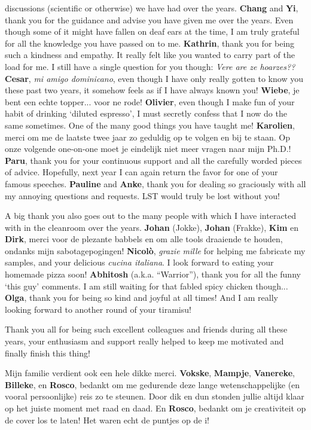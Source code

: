 discussions (scientific or otherwise) we have had over the years. \textbf{Chang} and \textbf{Yi}, thank you
for the guidance and advise you have given me over the years. Even though some of it might have fallen on deaf
ears at the time, I am truly grateful for all the knowledge you have passed on to me. \textbf{Kathrin}, thank
you for being such a kindness and empathy. It really felt like you wanted to carry part of the load for me. I
still have a single question for you though: \textit{Vere are ze hoarzes??} \textbf{Cesar}, \textit{mi amigo
dominicano}, even though I have only really gotten to know you these past two years, it somehow feels as if I
have always known you! \textbf{Wiebe}, je bent een echte topper... voor ne rode! \textbf{Olivier}, even though
I make fun of your habit of drinking `diluted espresso', I must secretly confess that I now do the same
sometimes. One of the many good things you have taught me! \textbf{Karolien}, merci om me de laatste twee jaar
zo geduldig op te volgen en bij te staan. Op onze volgende one-on-one moet je eindelijk niet meer vragen naar
mijn Ph.D.! \textbf{Paru}, thank you for your continuous support and all the carefully worded pieces of
advice. Hopefully, next year I can again return the favor for one of your famous speeches. \textbf{Pauline}
and \textbf{Anke}, thank you for dealing so graciously with all my annoying questions and requests. LST would
truly be lost without you!

A big thank you also goes out to the many people with which I have interacted with in the cleanroom over the
years. \textbf{Johan} (Jokke), \textbf{Johan} (Frakke), \textbf{Kim} en \textbf{Dirk}, merci voor de plezante
babbels en om alle tools draaiende te houden, ondanks mijn sabotagepogingen! \textbf{Nicol\`{o}},
\textit{grazie mille} for helping me fabricate my samples, and your delicious \textit{cucina italiana}. I look
forward to eating your homemade pizza soon! \textbf{Abhitosh} (a.k.a. ``Warrior''), thank you for all the
funny `this guy' comments. I am still waiting for that fabled spicy chicken though... \textbf{Olga}, thank you
for being so kind and joyful at all times! And I am really looking forward to another round of your tiramisu!

Thank you all for being such excellent colleagues and friends during all these years, your enthusiasm and
support really helped to keep me motivated and finally finish this thing! 

Mijn familie verdient ook een hele dikke merci. \textbf{Vokske}, \textbf{Mampje}, \textbf{Vanereke},
\textbf{Billeke}, en \textbf{Rosco}, bedankt om me gedurende deze lange wetenschappelijke (en vooral
persoonlijke) reis zo te steunen. Door dik en dun stonden jullie altijd klaar op het juiste moment met raad en
daad. En \textbf{Rosco}, bedankt om je creativiteit op de cover los te laten! Het waren echt de puntjes op de
i!

